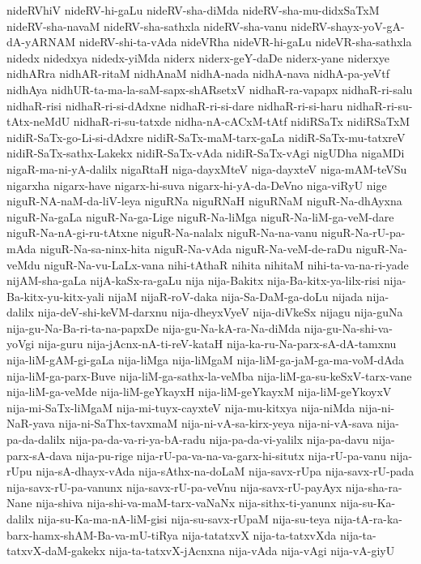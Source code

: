 {nideRVhiV
nideRV-hi-gaLu
nideRV-sha-diMda
nideRV-sha-mu-didxSaTxM
nideRV-sha-navaM
nideRV-sha-sathxla
nideRV-sha-vanu
nideRV-shayx-yoV-gA-dA-yARNAM
nideRV-shi-ta-vAda
nideVRha
nideVR-hi-gaLu
nideVR-sha-sathxla
nidedx
nidedxya
nidedx-yiMda
niderx
niderx-geY-daDe
niderx-yane
niderxye
nidhARra
nidhAR-ritaM
nidhAnaM
nidhA-nada
nidhA-nava
nidhA-pa-yeVtf
nidhAya
nidhUR-ta-ma-la-saM-sapx-shARsetxV
nidhaR-ra-vapapx
nidhaR-ri-salu
nidhaR-risi
nidhaR-ri-si-dAdxne
nidhaR-ri-si-dare
nidhaR-ri-si-haru
nidhaR-ri-su-tAtx-neMdU
nidhaR-ri-su-tatxde
nidha-nA-cACxM-tAtf
nidiRSaTx
nidiRSaTxM
nidiR-SaTx-go-Li-si-dAdxre
nidiR-SaTx-maM-tarx-gaLa
nidiR-SaTx-mu-tatxreV
nidiR-SaTx-sathx-Lakekx
nidiR-SaTx-vAda
nidiR-SaTx-vAgi
nigUDha
nigaMDi
nigaR-ma-ni-yA-dalilx
nigaRtaH
niga-dayxMteV
niga-dayxteV
niga-mAM-teVSu
nigarxha
nigarx-have
nigarx-hi-suva
nigarx-hi-yA-da-DeVno
niga-viRyU
nige
niguR-NA-naM-da-liV-leya
niguRNa
niguRNaH
niguRNaM
niguR-Na-dhAyxna
niguR-Na-gaLa
niguR-Na-ga-Lige
niguR-Na-liMga
niguR-Na-liM-ga-veM-dare
niguR-Na-nA-gi-ru-tAtxne
niguR-Na-nalalx
niguR-Na-na-vanu
niguR-Na-rU-pa-mAda
niguR-Na-sa-ninx-hita
niguR-Na-vAda
niguR-Na-veM-de-raDu
niguR-Na-veMdu
niguR-Na-vu-LaLx-vana
nihi-tAthaR
nihita
nihitaM
nihi-ta-va-na-ri-yade
nijAM-sha-gaLa
nijA-kaSx-ra-gaLu
nija
nija-Bakitx
nija-Ba-kitx-ya-lilx-risi
nija-Ba-kitx-yu-kitx-yali
nijaM
nijaR-roV-daka
nija-Sa-DaM-ga-doLu
nijada
nija-dalilx
nija-deV-shi-keVM-darxnu
nija-dheyxVyeV
nija-diVkeSx
nijagu
nija-guNa
nija-gu-Na-Ba-ri-ta-na-papxDe
nija-gu-Na-kA-ra-Na-diMda
nija-gu-Na-shi-va-yoVgi
nija-guru
nija-jAcnx-nA-ti-reV-kataH
nija-ka-ru-Na-parx-sA-dA-tamxnu
nija-liM-gAM-gi-gaLa
nija-liMga
nija-liMgaM
nija-liM-ga-jaM-ga-ma-voM-dAda
nija-liM-ga-parx-Buve
nija-liM-ga-sathx-la-veMba
nija-liM-ga-su-keSxV-tarx-vane
nija-liM-ga-veMde
nija-liM-geYkayxH
nija-liM-geYkayxM
nija-liM-geYkoyxV
nija-mi-SaTx-liMgaM
nija-mi-tuyx-cayxteV
nija-mu-kitxya
nija-niMda
nija-ni-NaR-yava
nija-ni-SaThx-tavxmaM
nija-ni-vA-sa-kirx-yeya
nija-ni-vA-sava
nija-pa-da-dalilx
nija-pa-da-va-ri-ya-bA-radu
nija-pa-da-vi-yalilx
nija-pa-davu
nija-parx-sA-dava
nija-pu-rige
nija-rU-pa-va-na-va-garx-hi-situtx
nija-rU-pa-vanu
nija-rUpu
nija-sA-dhayx-vAda
nija-sAthx-na-doLaM
nija-savx-rUpa
nija-savx-rU-pada
nija-savx-rU-pa-vanunx
nija-savx-rU-pa-veVnu
nija-savx-rU-payAyx
nija-sha-ra-Nane
nija-shiva
nija-shi-va-maM-tarx-vaNaNx
nija-sithx-ti-yanunx
nija-su-Ka-dalilx
nija-su-Ka-ma-nA-liM-gisi
nija-su-savx-rUpaM
nija-su-teya
nija-tA-ra-ka-barx-hamx-shAM-Ba-va-mU-tiRya
nija-tatatxvX
nija-ta-tatxvXda
nija-ta-tatxvX-daM-gakekx
nija-ta-tatxvX-jAcnxna
nija-vAda
nija-vAgi
nija-vA-giyU
}
